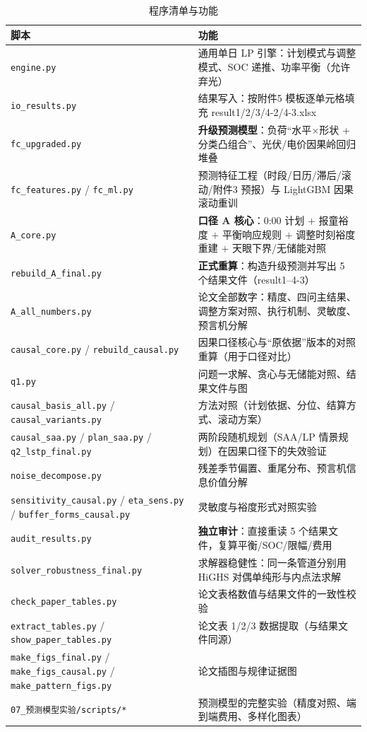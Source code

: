 \begin{table}[htbp]
\centering
\caption{程序清单与功能}
\label{tab:code}
\scriptsize
\begin{tabularx}{\textwidth}{@{}p{4.6cm}X@{}}
\toprule
脚本 & 功能 \\
\midrule
\texttt{engine.py} & 通用单日 LP 引擎：计划模式与调整模式、SOC 递推、功率平衡（允许弃光） \\
\texttt{io\_results.py} & 结果写入：按附件5 模板逐单元格填充 result1/2/3/4-2/4-3.xlsx \\
\texttt{fc\_upgraded.py} & \textbf{升级预测模型}：负荷“水平$\times$形状 + 分类凸组合”、光伏/电价因果岭回归堆叠 \\
\texttt{fc\_features.py} / \texttt{fc\_ml.py} & 预测特征工程（时段/日历/滞后/滚动/附件3 预报）与 LightGBM 因果滚动重训 \\
\texttt{A\_core.py} & \textbf{口径 A 核心}：0:00 计划 $+$ 报童裕度 $+$ 平衡响应规则 $+$ 调整时刻裕度重建 $+$ 天眼下界/无储能对照 \\
\texttt{rebuild\_A\_final.py} & \textbf{正式重算}：构造升级预测并写出 5 个结果文件（result1--4-3） \\
\texttt{A\_all\_numbers.py} & 论文全部数字：精度、四问主结果、调整方案对照、执行机制、灵敏度、预言机分解 \\
\texttt{causal\_core.py} / \texttt{rebuild\_causal.py} & 因果口径核心与“原依据”版本的对照重算（用于口径对比） \\
\texttt{q1.py} & 问题一求解、贪心与无储能对照、结果文件与图 \\
\texttt{causal\_basis\_all.py} / \texttt{causal\_variants.py} & 方法对照（计划依据、分位、结算方式、滚动方案） \\
\texttt{causal\_saa.py} / \texttt{plan\_saa.py} / \texttt{q2\_lstp\_final.py} & 两阶段随机规划（SAA/LP 情景规划）在因果口径下的失效验证 \\
\texttt{noise\_decompose.py} & 残差季节偏置、重尾分布、预言机信息价值分解 \\
\texttt{sensitivity\_causal.py} / \texttt{eta\_sens.py} / \texttt{buffer\_forms\_causal.py} & 灵敏度与裕度形式对照实验 \\
\texttt{audit\_results.py} & \textbf{独立审计}：直接重读 5 个结果文件，复算平衡/SOC/限幅/费用 \\
\texttt{solver\_robustness\_final.py} & 求解器稳健性：同一条管道分别用 HiGHS 对偶单纯形与内点法求解 \\
\texttt{check\_paper\_tables.py} & 论文表格数值与结果文件的一致性校验 \\
\texttt{extract\_tables.py} / \texttt{show\_paper\_tables.py} & 论文表 1/2/3 数据提取（与结果文件同源） \\
\texttt{make\_figs\_final.py} / \texttt{make\_figs\_causal.py} / \texttt{make\_pattern\_figs.py} & 论文插图与规律证据图 \\
\texttt{07\_预测模型实验/scripts/*} & 预测模型的完整实验（精度对照、端到端费用、多样化图表） \\
\bottomrule
\end{tabularx}
\end{table}

